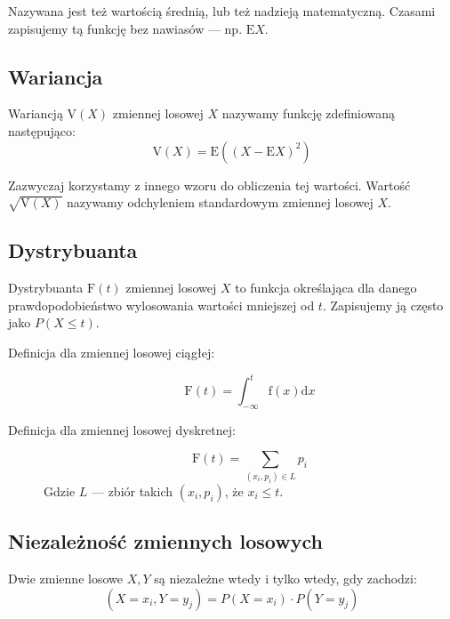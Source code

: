 \documentclass[a4paper,12pt]{article}
\begin{document}
Nazywana jest też wartością średnią, lub też nadzieją matematyczną. Czasami zapisujemy tą funkcję bez nawiasów --- np. $\textrm{E}X$.

\subsection{Wariancja}
Wariancją $\textrm{V}\left(X\right)$ zmiennej losowej $X$ nazywamy funkcję zdefiniowaną następująco:
\begin{equation}
  \textrm{V}(X) = \textrm{E}\left(\left(X - \textrm{E}X\right)^2\right)
\end{equation}

Zazwyczaj korzystamy z innego wzoru do obliczenia tej wartości. Wartość $\sqrt{\textrm{V}(X)}$ nazywamy odchyleniem standardowym zmiennej losowej $X$.

\subsection{Dystrybuanta} 
Dystrybuanta $\textrm{F}\left(t\right)$ zmiennej losowej $X$ to funkcja określająca dla danego prawdopodobieństwo wylosowania wartości mniejszej od $t$. Zapisujemy ją często jako $P\left(X \le t\right)$.

\begin{description}
\item[Definicja dla zmiennej losowej ciągłej:] 
  \begin{equation}
    \textrm{F}\left(t\right) = \int_{-\infty}^{t} \textrm{f}\left(x\right)\textrm{d}x
  \end{equation}
\item[Definicja dla zmiennej losowej dyskretnej:]
  \begin{equation}
    \textrm{F}\left(t\right) = \sum_{\left(x_i,p_i\right) \in L} p_i
  \end{equation}
  Gdzie $L$ --- zbiór takich $\left(x_i, p_i\right)$, że $x_i \le t$.
\end{description}

\subsection{Niezależność zmiennych losowych}

Dwie zmienne losowe $X, Y$ są niezależne wtedy i tylko wtedy, gdy zachodzi:
\begin{equation}
\left(X = x_i, Y = y_j\right) = P\left(X = x_i\right) \cdot P\left(Y = y_j\right)
\end{equation}
\end{document}
